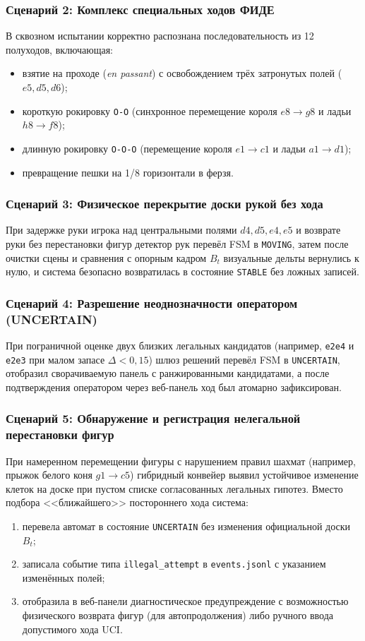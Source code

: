 \subsubsection{Сценарий 2: Комплекс специальных ходов ФИДЕ}
В сквозном испытании корректно распознана последовательность из 12 полуходов, включающая:
\begin{itemize}
    \item взятие на проходе (\textit{en passant}) с освобождением трёх затронутых полей ($e5, d5, d6$);
    \item короткую рокировку \texttt{O-O} (синхронное перемещение короля $e8 \to g8$ и ладьи $h8 \to f8$);
    \item длинную рокировку \texttt{O-O-O} (перемещение короля $e1 \to c1$ и ладьи $a1 \to d1$);
    \item превращение пешки на 1/8 горизонтали в ферзя.
\end{itemize}

\subsubsection{Сценарий 3: Физическое перекрытие доски рукой без хода}
При задержке руки игрока над центральными полями $d4, d5, e4, e5$ и возврате руки без перестановки фигур детектор рук перевёл FSM в \texttt{MOVING}, затем после очистки сцены и сравнения с опорным кадром $B_t$ визуальные дельты вернулись к нулю, и система безопасно возвратилась в состояние \texttt{STABLE} без ложных записей.

\subsubsection{Сценарий 4: Разрешение неоднозначности оператором (UNCERTAIN)}
При пограничной оценке двух близких легальных кандидатов (например, \texttt{e2e4} и \texttt{e2e3} при малом запасе $\Delta < 0{,}15$) шлюз решений перевёл FSM в \texttt{UNCERTAIN}, отобразил сворачиваемую панель с ранжированными кандидатами, а после подтверждения оператором через веб-панель ход был атомарно зафиксирован.

\subsubsection{Сценарий 5: Обнаружение и регистрация нелегальной перестановки фигур}
При намеренном перемещении фигуры с нарушением правил шахмат (например, прыжок белого коня $g1 \to c5$) гибридный конвейер выявил устойчивое изменение клеток на доске при пустом списке согласованных легальных гипотез. Вместо подбора <<ближайшего>> постороннего хода система:
\begin{enumerate}
    \item перевела автомат в состояние \texttt{UNCERTAIN} без изменения официальной доски $B_t$;
    \item записала событие типа \texttt{illegal\_attempt} в \texttt{events.jsonl} с указанием изменённых полей;
    \item отобразила в веб-панели диагностическое предупреждение с возможностью физического возврата фигур (для автопродолжения) либо ручного ввода допустимого хода UCI.
\end{enumerate}

